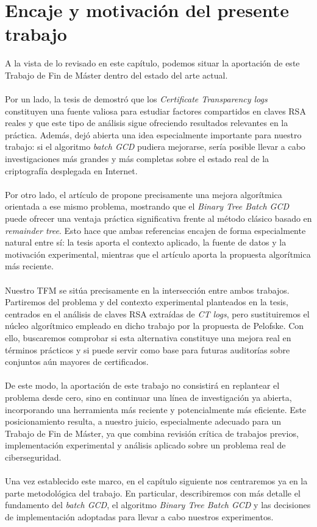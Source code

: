 \section{Encaje y motivación del presente trabajo}

A la vista de lo revisado en este capítulo, podemos situar la aportación de este Trabajo de Fin de Máster dentro del estado del arte actual.
\\
\\
Por un lado, la tesis de \citet{vage2022finding} demostró que los \textit{Certificate Transparency logs} constituyen una fuente valiosa para estudiar factores compartidos en claves RSA reales y que este tipo de análisis sigue ofreciendo resultados relevantes en la práctica. Además, dejó abierta una idea especialmente importante para nuestro trabajo: si el algoritmo \textit{batch GCD} pudiera mejorarse, sería posible llevar a cabo investigaciones más grandes y más completas sobre el estado real de la criptografía desplegada en Internet.
\\
\\
Por otro lado, el artículo de \citet{pelofske2024efficient} propone precisamente una mejora algorítmica orientada a ese mismo problema, mostrando que el \textit{Binary Tree Batch GCD} puede ofrecer una ventaja práctica significativa frente al método clásico basado en \textit{remainder tree}. Esto hace que ambas referencias encajen de forma especialmente natural entre sí: la tesis aporta el contexto aplicado, la fuente de datos y la motivación experimental, mientras que el artículo aporta la propuesta algorítmica más reciente.
\\
\\
Nuestro TFM se sitúa precisamente en la intersección entre ambos trabajos. Partiremos del problema y del contexto experimental planteados en la tesis, centrados en el análisis de claves RSA extraídas de \textit{CT logs}, pero sustituiremos el núcleo algorítmico empleado en dicho trabajo por la propuesta de Pelofske. Con ello, buscaremos comprobar si esta alternativa constituye una mejora real en términos prácticos y si puede servir como base para futuras auditorías sobre conjuntos aún mayores de certificados.
\\
\\
De este modo, la aportación de este trabajo no consistirá en replantear el problema desde cero, sino en continuar una línea de investigación ya abierta, incorporando una herramienta más reciente y potencialmente más eficiente. Este posicionamiento resulta, a nuestro juicio, especialmente adecuado para un Trabajo de Fin de Máster, ya que combina revisión crítica de trabajos previos, implementación experimental y análisis aplicado sobre un problema real de ciberseguridad.
\\
\\
Una vez establecido este marco, en el capítulo siguiente nos centraremos ya en la parte metodológica del trabajo. En particular, describiremos con más detalle el fundamento del \textit{batch GCD}, el algoritmo \textit{Binary Tree Batch GCD} y las decisiones de implementación adoptadas para llevar a cabo nuestros experimentos.
